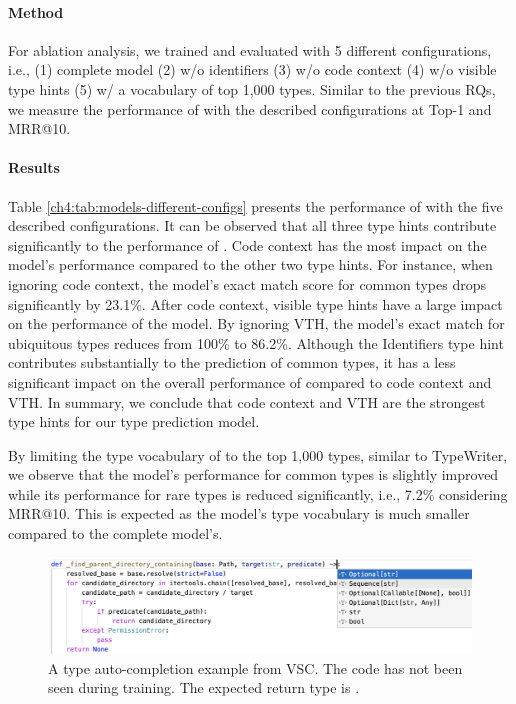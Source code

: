\paragraph{Method}
For ablation analysis, we trained and evaluated \name with 5 different configurations, i.e., (1) complete model (2) w/o identifiers (3) w/o code context (4) w/o visible type hints (5) w/ a vocabulary of top 1,000 types. Similar to the previous RQs, we measure the performance of \name with the described configurations at Top-1 and MRR@10.

\paragraph{Results}
Table \ref{ch4:tab:models-different-configs} presents the performance of \name with the five described configurations. It can be observed that all three type hints contribute significantly to the performance of \name. Code context has the most impact on the model's performance compared to the other two type hints. For instance, when ignoring code context, the model's exact match score for common types drops significantly by 23.1\%. After code context, visible type hints have a large impact on the performance of the model. By ignoring VTH, the model's exact match for ubiquitous types reduces from 100\% to 86.2\%. Although the Identifiers type hint contributes substantially to the prediction of common types, it has a less significant impact on the overall performance of \name compared to code context and VTH. In summary, we conclude that code context and VTH are the strongest type hints for our type prediction model.

By limiting the type vocabulary of \name to the top 1,000 types, similar to TypeWriter, we observe that the model's performance for common types is slightly improved while its performance for rare types is reduced significantly, i.e., 7.2\% considering MRR@10. This is expected as the model's type vocabulary is much smaller compared to the complete model's.

\begin{figure}[!t]
	\centering
	\includegraphics[width=\textwidth]{chapters/ch4/figs/VSC-IDE-pred.png}
	\caption{A type auto-completion example from VSC. The code has not been seen during training. The expected return type is .}
	\label{ch4:fig:VSC-IDE}
\end{figure}

